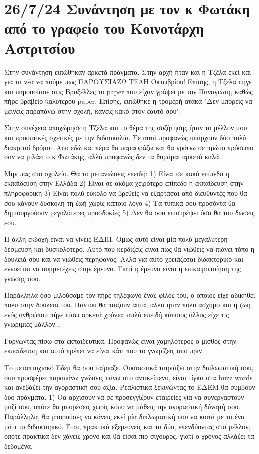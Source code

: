 \documentclass[a4paper,twoside,10pt]{article}
\begin{document}
\section{26/7/24 Συνάντηση με τον κ Φωτάκη από το γραφείο του Κοινοτάρχη Αστριτσίου}

Στην συνάντηση ειπώθηκαν αρκετά πράγματα. Στην αρχή ήταν και η Τζέλα εκεί και για τα νέα να πούμε πως ΠΑΡΟΥΣΙΑΖΩ ΤΕΛΗ Οκτωβρίου! Επίσης, η Τζέλα πήγε και παρουσίασε στις Βρυξέλλες το paper που είχαν γράψει με τον Παναγιώτη, καθώς πήρε βραβείο καλύτερου paper. Επίσης, ειπώθηκε η τρομερή ατάκα "Δεν μπορείς να μείνεις παραπάνω στην σχολή, κάνεις κακό στον εαυτό σου".

Στην συνέχεια αποχώρησε η Τζέλα και το θέμα της συζήτησης ήταν το μέλλον μου και προοπτικές σχετικές με την διδασκαλία. Σε αυτό προφανώς υπάρχουν δύο πολύ διακριτοί δρόμοι. Από εδώ και πέρα θα παραφράζω και θα γράψω σε πρώτο πρόσωπο σαν να μιλάει ο κ Φωτάκης, αλλά προφανώς δεν τα θυμάμαι αρκετά καλά. 


Μην πας στο σχολείο. Θα το μετανιώσεις επειδή: 1) Είναι σε κακό επίπεδο η εκπαίδευση στην Ελλάδα 2) Είναι σε ακόμα χειρότερο επίπεδο η εκπαίδευση στην πληροφορική 3) Είναι πολύ εύκολο να βρεθείς να εξαρτάσαι από διευθυντές που θα σου κάνουν δύσκολη τη ζωή χωρίς κάποιο λόγο 4) Τα τυπικά σου προσόντα θα δημιουργούσαν μεγαλύτερες προσδοκίες 5) Δεν θα σου επιστρέψει όσα θα του δώσεις εσύ.

Η άλλη εκδοχή είναι να γίνεις ΕΔΙΠ. Όμως αυτό είναι μία πολύ μεγαλύτερη δέσμευση και δυσκολότερο. Αυτό που κερδίζεις είναι πως θα νιώθεις να πιάνει τόπο η δουλειά σου και να νιώθεις περήφανος. Αλλά για αυτό χρειάζεσαι διδακτορικό και εννοείται να συμμετέχεις στην έρευνα. Γιατί η έρευνα είναι η επικαιροποίηση της γνώσης σου. 

Παράλληλα όσο μιλούσαμε τον πήρε τηλέφωνο ένας φίλος του, ο οποίος είχε αδικηθεί πολύ στην δουλειά του. Παντού θα παίζουν αυτά, αλλά ήταν πολύ άσχημο και η ζωή ενός ανθρώπου πήγε πίσω αρκετά χρόνια, απλά επειδή κάποιος άλλος είχε τις γνωριμίες μάλλον...

Γυρνώντας πίσω στα εκπαιδευτικά. Προφανώς είναι χαμηλότερος ο μισθός στην εκπαίδευση και αυτό πρέπει να είναι κάτι που το γνωρίζεις από πριν. 

Το μεταπτυχιακό Εδέμ θα σου ταίριαζε. Ουσιαστικά ταιριάζει στην διπλωματική σου, σου προσφέρει παραπάνω γνώσεις πάνω στο αντικείμενο, είναι τίγκα στα buzz words και ανεβάζει την αγοραστική σου αξία. Ρεαλιστικά ξεκινώντας το ΕΔΕΜ θα συμβούν δύο πράγματα. 1) Θα αρχίσουν να σε προσεγγίζουν εταιρείες για να συνεργαστούν μαζί σου, οπότε θα μπορέσεις χωρίς κόπο να μάθεις την αγοραστική δύναμή σου. Παράλληλα, θα μπορούσες να κάνεις εκεί μία διπλωματική που να κοιτά με το ένα μάτι το διδακτορικό. Έτσι, πρακτικά εξερευνείς και τα δύο, επενδύοντας στο μέλλον, οπότε πρακτικά δεν χάνεις χρόνο και θα είσαι πιο σίγουρος, γιατί ο χρόνος αλλάζει τα δεδομένα. 
\end{document}
